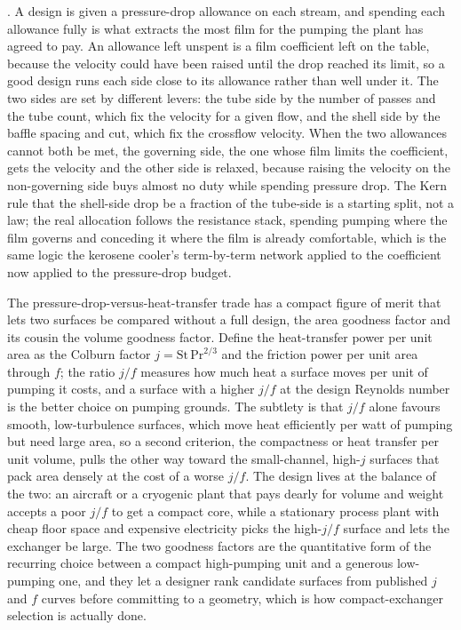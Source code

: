 . A design is
given a pressure-drop allowance on each stream, and spending each allowance fully
is what extracts the most film for the pumping the plant has agreed to pay. An
allowance left unspent is a film coefficient left on the table, because the velocity
could have been raised until the drop reached its limit, so a good design runs each
side close to its allowance rather than well under it. The two sides are set by
different levers: the tube side by the number of passes and the tube count, which
fix the velocity for a given flow, and the shell side by the baffle spacing and cut,
which fix the crossflow velocity. When the two allowances cannot both be met, the
governing side, the one whose film limits the coefficient, gets the velocity and the
other side is relaxed, because raising the velocity on the non-governing side buys
almost no duty while spending pressure drop. The Kern rule that the shell-side drop
be a fraction of the tube-side is a starting split, not a law; the real allocation
follows the resistance stack, spending pumping where the film governs and conceding
it where the film is already comfortable, which is the same logic the kerosene
cooler's term-by-term network applied to the coefficient now applied to the
pressure-drop budget.

\begin{mastery}
The pressure-drop-versus-heat-transfer trade has a compact figure of merit that
lets two surfaces be compared without a full design, the area goodness factor and
its cousin the volume goodness factor. Define the heat-transfer power per unit area
as the Colburn factor $j = \mathrm{St}\,\mathrm{Pr}^{2/3}$ and the friction power
per unit area through $f$; the ratio $j/f$ measures how much heat a surface moves
per unit of pumping it costs, and a surface with a higher $j/f$ at the design
Reynolds number is the better choice on pumping grounds. The subtlety is that $j/f$
alone favours smooth, low-turbulence surfaces, which move heat efficiently per
watt of pumping but need large area, so a second criterion, the compactness or heat
transfer per unit volume, pulls the other way toward the small-channel, high-$j$
surfaces that pack area densely at the cost of a worse $j/f$. The design lives at the
balance of the two: an aircraft or a cryogenic plant that pays dearly for volume
and weight accepts a poor $j/f$ to get a compact core, while a stationary process
plant with cheap floor space and expensive electricity picks the high-$j/f$ surface
and lets the exchanger be large. The two goodness factors are the quantitative form
of the recurring choice between a compact high-pumping unit and a generous
low-pumping one, and they let a designer rank candidate surfaces from published
$j$ and $f$ curves before committing to a geometry, which is how compact-exchanger
selection is actually done.
\end{mastery}

